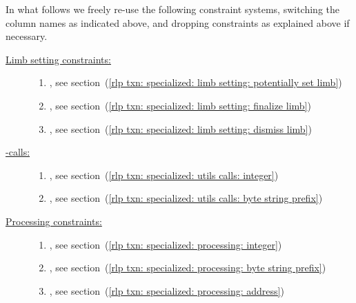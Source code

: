 In what follows we freely re-use the following constraint systems,
switching the column names as indicated above,
and dropping constraints as explained above if necessary.
\begin{description}
	\item[\underline{Limb setting constraints:}]
		\begin{enumerate}
			\item
				\setLimbName{},
				see section~(\ref{rlp txn: specialized: limb setting: potentially set limb})
			\item
				\conditionallySetLimbName{},
				see section~(\ref{rlp txn: specialized: limb setting: finalize limb})
			\item
				\discardLimbName{},
				see section~(\ref{rlp txn: specialized: limb setting: dismiss limb})
		\end{enumerate}
	\item[\underline{\rlpUtilsMod{}-calls:}]
		\begin{enumerate}
			\item
				\rlpUtilsInstCallByteStringPrefixName{},
				see section~(\ref{rlp txn: specialized: utils calls: integer})
			\item
				\rlpUtilsInstCallIntegerName{},
				see section~(\ref{rlp txn: specialized: utils calls: byte string prefix})
		\end{enumerate}
	\item[\underline{Processing constraints:}]
		\begin{enumerate}
			\item
				\rlpProcessIntegerName{},
				see section~(\ref{rlp txn: specialized: processing: integer})
			\item
				\rlpProcessByteStringName{},
				see section~(\ref{rlp txn: specialized: processing: byte string prefix})
			\item
				\rlpProcessAddressName{},
				see section~(\ref{rlp txn: specialized: processing: address})
		\end{enumerate}
\end{description}

